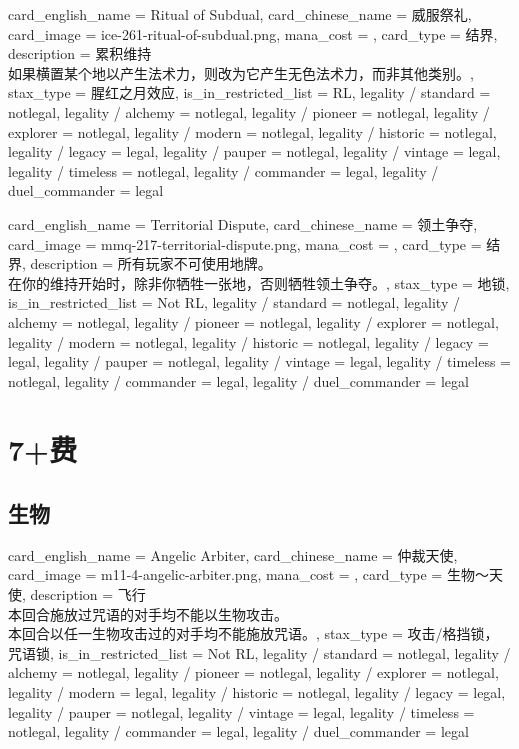 \documentclass[lang = cn, color = black, 10pt]{AllThatStax}
\begin{document}
\card
{
	card_english_name = {Ritual of Subdual},
	card_chinese_name = {威服祭礼},
	card_image = ice-261-ritual-of-subdual.png,
	mana_cost = ,
	card_type = 结界,
	description = {累积维持\\
如果横置某个地以产生法术力，则改为它产生无色法术力，而非其他类别。},
	stax_type = 腥红之月效应,
	is_in_restricted_list = RL,
	legality / standard = notlegal,
	legality / alchemy = notlegal,
	legality / pioneer = notlegal,
	legality / explorer = notlegal,
	legality / modern = notlegal,
	legality / historic = notlegal,
	legality / legacy = legal,
	legality / pauper = notlegal,
	legality / vintage = legal,
	legality / timeless = notlegal,
	legality / commander = legal,
	legality / duel_commander = legal
}

\card
{
	card_english_name = {Territorial Dispute},
	card_chinese_name = {领土争夺},
	card_image = mmq-217-territorial-dispute.png,
	mana_cost = ,
	card_type = 结界,
	description = {所有玩家不可使用地牌。\\
在你的维持开始时，除非你牺牲一张地，否则牺牲领土争夺。},
	stax_type = 地锁,
	is_in_restricted_list = Not RL,
	legality / standard = notlegal,
	legality / alchemy = notlegal,
	legality / pioneer = notlegal,
	legality / explorer = notlegal,
	legality / modern = notlegal,
	legality / historic = notlegal,
	legality / legacy = legal,
	legality / pauper = notlegal,
	legality / vintage = legal,
	legality / timeless = notlegal,
	legality / commander = legal,
	legality / duel_commander = legal
}

\chapter{7+费}

\section{生物}

\card
{
	card_english_name = {Angelic Arbiter},
	card_chinese_name = {仲裁天使},
	card_image = m11-4-angelic-arbiter.png,
	mana_cost = ,
	card_type = 生物～天使,
	description = {飞行\\
本回合施放过咒语的对手均不能以生物攻击。\\
本回合以任一生物攻击过的对手均不能施放咒语。},
	stax_type = 攻击/格挡锁，咒语锁,
	is_in_restricted_list = Not RL,
	legality / standard = notlegal,
	legality / alchemy = notlegal,
	legality / pioneer = notlegal,
	legality / explorer = notlegal,
	legality / modern = legal,
	legality / historic = notlegal,
	legality / legacy = legal,
	legality / pauper = notlegal,
	legality / vintage = legal,
	legality / timeless = notlegal,
	legality / commander = legal,
	legality / duel_commander = legal
}
\end{document}
